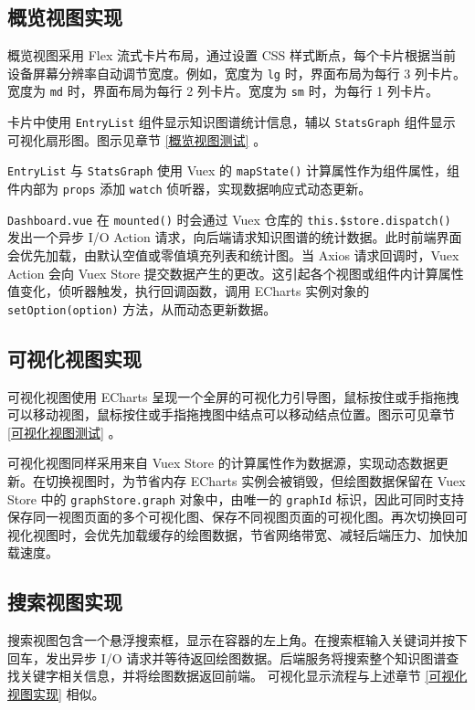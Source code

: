 \documentclass[a4paper,AutoFakeBold,oneside,12pt]{book}
\begin{document}
\subsection{概览视图实现\label{概览视图实现}}

概览视图采用 Flex 流式卡片布局，通过设置 CSS 样式断点，每个卡片根据当前设备屏幕分辨率自动调节宽度。例如，宽度为 \lstinline|lg| 时，界面布局为每行 3 列卡片。宽度为 \lstinline|md| 时，界面布局为每行 2 列卡片。宽度为 \lstinline|sm| 时，为每行 1 列卡片。

卡片中使用 \lstinline|EntryList| 组件显示知识图谱统计信息，辅以 \lstinline|StatsGraph| 组件显示可视化扇形图。图示见章节 \ref{概览视图测试} 。

\lstinline|EntryList| 与 \lstinline|StatsGraph| 使用 Vuex 的 \lstinline|mapState()| 计算属性作为组件属性，组件内部为 \lstinline|props| 添加 \lstinline|watch| 侦听器，实现数据响应式动态更新。

\lstinline|Dashboard.vue| 在 \lstinline|mounted()| 时会通过 Vuex 仓库的 \lstinline|this.$store.dispatch()| 发出一个异步 I/O Action 请求，向后端请求知识图谱的统计数据。此时前端界面会优先加载，由默认空值或零值填充列表和统计图。当 Axios 请求回调时，Vuex Action 会向 Vuex Store 提交数据产生的更改。这引起各个视图或组件内计算属性值变化，侦听器触发，执行回调函数，调用 ECharts 实例对象的 \lstinline|setOption(option)| 方法，从而动态更新数据。

\subsection{可视化视图实现\label{可视化视图实现}}

可视化视图使用 ECharts 呈现一个全屏的可视化力引导图，鼠标按住或手指拖拽可以移动视图，鼠标按住或手指拖拽图中结点可以移动结点位置。图示可见章节 \ref{可视化视图测试} 。

可视化视图同样采用来自 Vuex Store 的计算属性作为数据源，实现动态数据更新。在切换视图时，为节省内存 ECharts 实例会被销毁，但绘图数据保留在 Vuex Store 中的 \lstinline|graphStore.graph| 对象中，由唯一的 \lstinline|graphId| 标识，因此可同时支持保存同一视图页面的多个可视化图、保存不同视图页面的可视化图。再次切换回可视化视图时，会优先加载缓存的绘图数据，节省网络带宽、减轻后端压力、加快加载速度。

\subsection{搜索视图实现}

搜索视图包含一个悬浮搜索框，显示在容器的左上角。在搜索框输入关键词并按下回车，发出异步 I/O 请求并等待返回绘图数据。后端服务将搜索整个知识图谱查找关键字相关信息，并将绘图数据返回前端。 可视化显示流程与上述章节 \ref{可视化视图实现} 相似。
\end{document}
